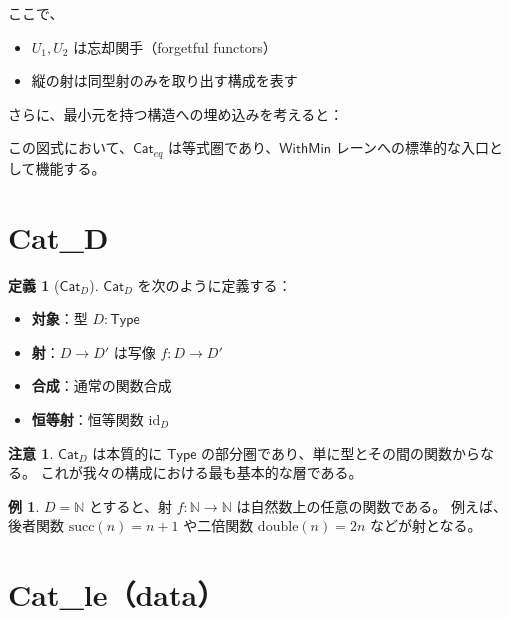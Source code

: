 \documentclass[a4paper,12pt]{ltjsarticle}
\theoremstyle{definition}
\newtheorem{definition}{定義}[section]
\newtheorem{example}{例}[section]
\newtheorem{remark}{注意}[section]
\begin{document}
ここで、
\begin{itemize}
  \item $U_1, U_2$ は忘却関手（forgetful functors）
  \item 縦の射は同型射のみを取り出す構成を表す
\end{itemize}

さらに、最小元を持つ構造への埋め込みを考えると：

\begin{center}
\end{center}

この図式において、$\mathsf{Cat}_{eq}$ は等式圏であり、$\mathsf{WithMin}$ レーンへの標準的な入口として機能する。


\section{Cat\_D}

\begin{definition}[$\mathsf{Cat}_D$]
$\mathsf{Cat}_D$ を次のように定義する：
\begin{itemize}
  \item \textbf{対象}：型 $D : \mathsf{Type}$
  \item \textbf{射}：$D \to D'$ は写像 $f : D \to D'$
  \item \textbf{合成}：通常の関数合成
  \item \textbf{恒等射}：恒等関数 $\mathrm{id}_D$
\end{itemize}
\end{definition}

\begin{remark}
$\mathsf{Cat}_D$ は本質的に $\mathsf{Type}$ の部分圏であり、単に型とその間の関数からなる。
これが我々の構成における最も基本的な層である。
\end{remark}

\begin{example}
$D = \mathbb{N}$ とすると、射 $f : \mathbb{N} \to \mathbb{N}$ は自然数上の任意の関数である。
例えば、後者関数 $\mathrm{succ}(n) = n + 1$ や二倍関数 $\mathrm{double}(n) = 2n$ などが射となる。
\end{example}


\section{Cat\_le（data）}
\end{document}
